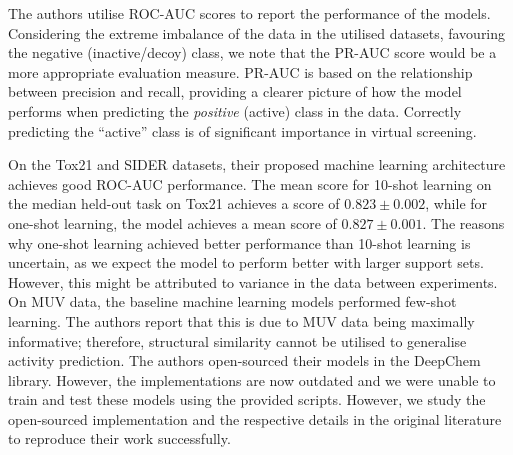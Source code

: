 The authors utilise ROC-AUC scores to report the performance of the models. Considering the extreme imbalance of the data in the utilised datasets, favouring the negative (inactive/decoy) class, we note that the PR-AUC score would be a more appropriate evaluation measure. PR-AUC is based on the relationship between precision and recall, providing a clearer picture of how the model performs when predicting the \textit{positive} (active) class in the data. Correctly predicting the ``active'' class is of significant importance in virtual screening.

On the Tox21 and SIDER datasets, their proposed machine learning architecture achieves good ROC-AUC performance. The mean score for 10-shot learning on the median held-out task on Tox21 achieves a score of $0.823 \pm 0.002$, while for one-shot learning, the model achieves a mean score of $0.827 \pm 0.001$. The reasons why one-shot learning achieved better performance than 10-shot learning is uncertain, as we expect the model to perform better with larger support sets. However, this might be attributed to variance in the data between experiments. On MUV data, the baseline machine learning models performed few-shot learning. The authors report that this is due to MUV data being maximally informative; therefore, structural similarity cannot be utilised to generalise activity prediction. The authors open-sourced their models in the DeepChem library\citep{ramsundar2019deep}. However, the implementations are now outdated and we were unable to train and test these models using the provided scripts. However, we study the open-sourced implementation and the respective details in the original literature to reproduce their work successfully.
